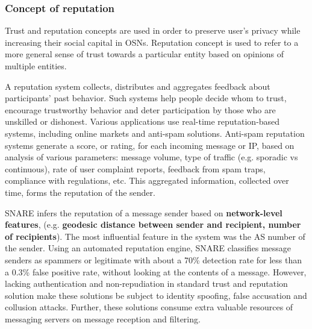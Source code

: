 \subsubsection{Concept of reputation}

Trust and reputation concepts are used in order to preserve user’s privacy while increasing their social capital in OSNs.
Reputation concept is used to refer to a more general sense of trust towards a particular entity based on opinions of multiple entities.

A reputation system collects,
	distributes and aggregates feedback about participants’ past behavior.
Such systems help people decide whom to trust,
	encourage trustworthy behavior and deter participation by those who are unskilled or dishonest.
Various applications use real-time reputation-based systems,
	including online markets and anti-spam solutions.
Anti-spam reputation systems generate a score,
	or rating,
	for each incoming message or IP,
	based on analysis of various parameters: message volume,
	type of traffic (e.g. sporadic vs continuous),
	rate of user complaint reports,
	feedback from spam traps,
	compliance with regulations,
	etc.
This aggregated information,
	collected over time,
	forms the reputation of the sender.

SNARE \cite{hao_detecting_2009} infers the reputation of a message sender based on \textbf{network-level features},
	(e.g. \textbf{geodesic distance between sender and recipient, number of recipients}).
The most influential feature in the system was the AS number of the sender.
Using an automated reputation engine,
	SNARE classifies message senders as spammers or legitimate with about a 70\% detection rate for less than a 0.3\% false positive rate,
	without looking at the contents of a message.
However,
	lacking authentication and non-repudiation in standard trust and reputation solution make these solutions be subject to identity spoofing,
	false accusation and collusion attacks.
Further,
	these solutions consume extra valuable resources of messaging servers on message reception and filtering.

